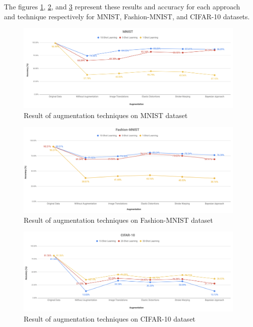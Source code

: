 The figures \ref{fig:MNIST_result}, \ref{fig:Fashion_MNIST_result}, and
\ref{fig:CIFAR_10_result} represent these results and accuracy for each approach and technique
respectively for
MNIST, Fashion-MNIST, and CIFAR-10 datasets.


\begin{figure}
  \centering
  \label{fig:MNIST_result}
  \includegraphics[width=1\textwidth]{fig/result/mnist-result}
  \caption{Result of augmentation techniques on MNIST dataset}
\end{figure}


\begin{figure}
  \centering
  \label{fig:Fashion_MNIST_result}
  \includegraphics[width=1\textwidth]{fig/result/fashion-mnist-result}
  \caption{Result of augmentation techniques on Fashion-MNIST dataset}
\end{figure}


\begin{figure}
  \centering
  \label{fig:CIFAR_10_result}
  \includegraphics[width=1\textwidth]{fig/result/cifar-10-result}
  \caption{Result of augmentation techniques on CIFAR-10 dataset}
\end{figure}

